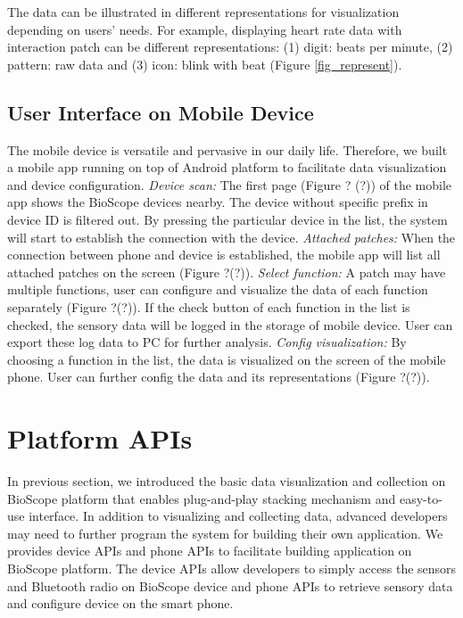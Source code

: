 The data can be illustrated in different representations for visualization depending on users' needs.
For example, displaying heart rate data with interaction patch can be different representations: (1) digit: beats per minute, (2) pattern: raw data and (3) icon: blink with beat (Figure \ref{fig_represent}).


\subsection{User Interface on Mobile Device}
The mobile device is versatile and pervasive in our daily life.
Therefore, we built a mobile app running on top of Android platform to facilitate data visualization and device configuration.
\vspace{10pt}
\newline
\textit{Device scan:}
\newline
The first page (Figure ? (?)) of the mobile app shows the BioScope devices nearby. The device without specific prefix in device ID is filtered out. By pressing the particular device in the list, the system will start to establish the connection with the device.
\vspace{10pt}
\newline
\textit{Attached patches:}
\newline
When the connection between phone and device is established, the mobile app will list all attached patches on the screen (Figure ?(?)).
\vspace{10pt}
\newline
\textit{Select function:}
\newline
A patch may have multiple functions, user can configure and visualize the data of each function separately (Figure ?(?)).
If the check button of each function in the list is checked, the sensory data will be logged in the storage of mobile device.
User can export these log data to PC for further analysis.
\vspace{10pt}
\newline
\textit{Config visualization:}
\newline
By choosing a function in the list, the data is visualized on the screen of the mobile phone. User can further config the data and its representations (Figure ?(?)).


\section{Platform APIs}
In previous section, we introduced the basic data visualization and collection on BioScope platform that enables plug-and-play stacking mechanism and easy-to-use interface.
In addition to visualizing and collecting data, advanced developers may need to further program the system for building their own application.
We provides device APIs and phone APIs to facilitate building application on BioScope platform.
The device APIs allow developers to simply access the sensors and Bluetooth radio on BioScope device and phone APIs to retrieve sensory data and configure device on the smart phone. 

